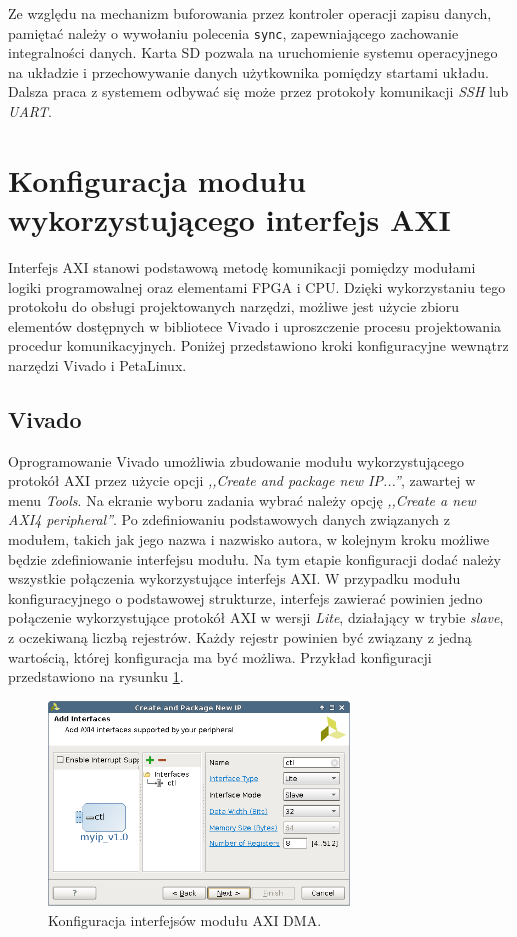 Ze względu na mechanizm buforowania przez kontroler operacji zapisu danych, pamiętać należy o wywołaniu polecenia \texttt{sync}, zapewniającego zachowanie integralności danych.
Karta SD pozwala na uruchomienie systemu operacyjnego na układzie i przechowywanie danych użytkownika pomiędzy startami układu. 
Dalsza praca z systemem odbywać się może przez protokoły komunikacji \emph{SSH} lub \emph{UART}.

\section{Konfiguracja modułu wykorzystującego interfejs AXI}
\label{sec:vivado-axi-dma}

Interfejs AXI stanowi podstawową metodę komunikacji pomiędzy modułami logiki programowalnej oraz elementami FPGA i CPU. 
Dzięki wykorzystaniu tego protokołu do obsługi projektowanych narzędzi, możliwe jest użycie zbioru elementów dostępnych w bibliotece Vivado i uproszczenie procesu projektowania procedur komunikacyjnych. 
Poniżej przedstawiono kroki konfiguracyjne wewnątrz narzędzi Vivado i PetaLinux.

\subsection{Vivado}
Oprogramowanie Vivado umożliwia zbudowanie modułu wykorzystującego protokół AXI przez użycie opcji \emph{,,Create and package new IP...''}, zawartej w menu \emph{Tools}.
Na ekranie wyboru zadania wybrać należy opcję \emph{,,Create a new AXI4 peripheral''}.
Po zdefiniowaniu podstawowych danych związanych z modułem, takich jak jego nazwa i nazwisko autora, w kolejnym kroku możliwe będzie zdefiniowanie interfejsu modułu. 
Na tym etapie konfiguracji dodać należy wszystkie połączenia wykorzystujące interfejs AXI. 
W przypadku modułu konfiguracyjnego o podstawowej strukturze, interfejs zawierać powinien jedno połączenie wykorzystujące protokół AXI w wersji \emph{Lite}, działający w trybie \emph{slave}, z oczekiwaną liczbą rejestrów. 
Każdy rejestr powinien być związany z jedną wartością, której konfiguracja ma być możliwa. 
Przykład konfiguracji przedstawiono na rysunku \ref{fig:axi-dma-interfaces-conf}.


\begin{figure}[H]
	\centering
	\includegraphics[width=8cm]{img/vivado/axi-dma-interfaces-conf.png}
	\caption{Konfiguracja interfejsów modułu AXI DMA.}
	\label{fig:axi-dma-interfaces-conf}
\end{figure}

